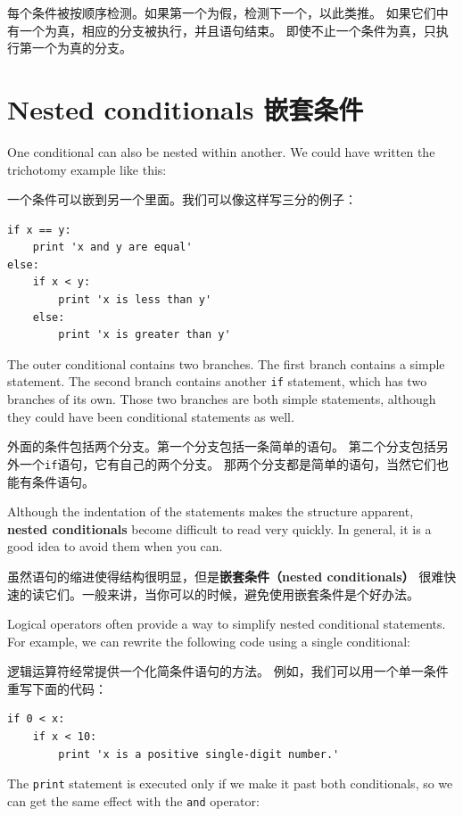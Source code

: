 \documentclass[10pt]{book}
\begin{document}
\begin{CJK}{UTF8}{gbsn}
每个条件被按顺序检测。如果第一个为假，检测下一个，以此类推。
如果它们中有一个为真，相应的分支被执行，并且语句结束。
即使不止一个条件为真，只执行第一个为真的分支。

\section{Nested conditionals 嵌套条件}

One conditional can also be nested within another.  We could have
written the trichotomy example like this:

一个条件可以嵌到另一个里面。我们可以像这样写三分的例子：

\begin{verbatim}
if x == y:
    print 'x and y are equal'
else:
    if x < y:
        print 'x is less than y'
    else:
        print 'x is greater than y'
\end{verbatim}
%
The outer conditional contains two branches.  The
first branch contains a simple statement.  The second branch
contains another {\tt if} statement, which has two branches of its
own.  Those two branches are both simple statements,
although they could have been conditional statements as well.

外面的条件包括两个分支。第一个分支包括一条简单的语句。
第二个分支包括另外一个{\tt if}语句，它有自己的两个分支。
那两个分支都是简单的语句，当然它们也能有条件语句。

Although the indentation of the statements makes the structure
apparent, {\bf nested conditionals} become difficult to read very
quickly. In general, it is a good idea to avoid them when you can.

虽然语句的缩进使得结构很明显，但是{\bf 嵌套条件（nested conditionals）}
很难快速的读它们。一般来讲，当你可以的时候，避免使用嵌套条件是个好办法。

Logical operators often provide a way to simplify nested conditional
statements.  For example, we can rewrite the following code using a
single conditional:

逻辑运算符经常提供一个化简条件语句的方法。
例如，我们可以用一个单一条件重写下面的代码：

\begin{verbatim}
if 0 < x:
    if x < 10:
        print 'x is a positive single-digit number.'
\end{verbatim}
%
The {\tt print} statement is executed only if we make it past both
conditionals, so we can get the same effect with the {\tt and} operator:


\end{CJK}
\end{document}

